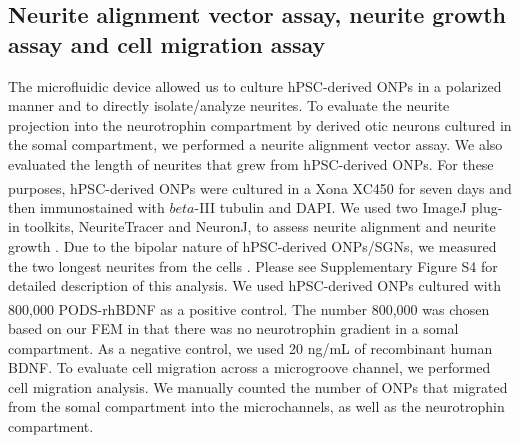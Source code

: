 \documentclass[review]{elsarticle}
\begin{document}
\subsection{Neurite alignment vector assay, neurite growth assay and cell migration assay}
The microfluidic device allowed us to culture hPSC-derived ONPs in a polarized manner and to directly isolate/analyze neurites. To evaluate the neurite projection into the neurotrophin compartment by derived otic neurons cultured in the somal compartment, we performed a neurite alignment vector assay. We also evaluated the length of neurites that grew from hPSC-derived ONPs. For these purposes, hPSC-derived ONPs were cultured in a Xona\textsuperscript{\texttrademark} XC450 for seven days and then immunostained with $beta$-III tubulin and DAPI. We used two ImageJ plug-in toolkits, NeuriteTracer and NeuronJ, to assess neurite alignment and neurite growth \cite{Pool2008, Meijering2004}. Due to the bipolar nature of hPSC-derived ONPs/SGNs, we measured the two longest neurites from the cells \cite{Matsuoka2017,Anniko1995}. Please see Supplementary Figure S4 for detailed description of this analysis. We used hPSC-derived ONPs cultured with 800,000 PODS\textsuperscript{\textregistered}-rhBDNF as a positive control. The number 800,000 was chosen based on our FEM in that there was no neurotrophin gradient in a somal compartment. As a negative control, we used 20 ng/mL of recombinant human BDNF. To evaluate cell migration across a microgroove channel, we performed cell migration analysis. We manually counted the number of ONPs that migrated from the somal compartment into the microchannels, as well as the neurotrophin compartment. 
\end{document}
